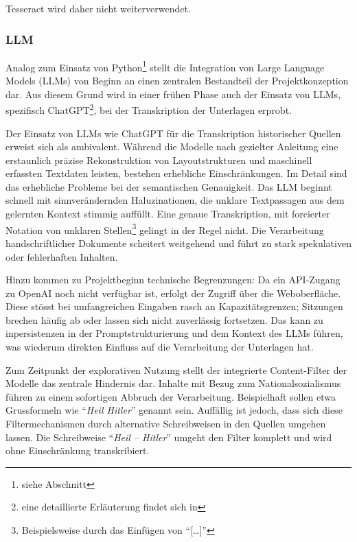 \documentclass[12pt, a4paper, ngerman, bidi=default]{article}
\begin{document}
Tesseract wird daher nicht weiterverwendet.

\subsubsection{LLM}\label{subsubsec:LLM_transcript}
Analog zum Einsatz von Python\footnote{siehe Abschnitt } stellt die Integration von Large Language Models (LLMs) von Beginn an einen zentralen Bestandteil der Projektkonzeption dar.
Aus diesem Grund wird in einer frühen Phase auch der Einsatz von LLMs, spezifisch ChatGPT\footnote{eine detaillierte Erläuterung findet sich in }, bei der Transkription der Unterlagen erprobt.

Der Einsatz von LLMs wie ChatGPT für die Transkription historischer Quellen erweist sich als ambivalent. Während die Modelle nach gezielter 
Anleitung eine erstaunlich präzise Rekonstruktion von Layoutstrukturen und maschinell erfassten Textdaten leisten, bestehen erhebliche Einschränkungen. Im Detail sind das
erhebliche Probleme bei der semantischen Genauigkeit. Das LLM beginnt schnell mit sinnverändernden Haluzinationen, die unklare Textpassagen aus dem gelernten Kontext stimmig auffüllt.
Eine genaue Transkription, mit forcierter Notation von unklaren Stellen\footnote{Beispielsweise durch das Einfügen von \enquote{[\dots]}} gelingt in der Regel nicht. 
Die Verarbeitung handschriftlicher Dokumente scheitert weitgehend und führt zu stark spekulativen oder fehlerhaften Inhalten.

Hinzu kommen zu Projektbeginn technische Begrenzungen: Da ein API-Zugang zu OpenAI noch nicht verfügbar ist, erfolgt der Zugriff 
über die Weboberfläche. Diese stösst bei umfangreichen Eingaben rasch an Kapazitätsgrenzen; 
Sitzungen brechen häufig ab oder lassen sich nicht zuverlässig fortsetzen. Das kann zu inpersistenzen in der Promptstrukturierung und
dem Kontext des LLMs führen, was wiederum direkten Einfluss auf die Verarbeitung der Unterlagen hat.

Zum Zeitpunkt der explorativen Nutzung stellt der integrierte Content-Filter der Modelle das zentrale Hindernis dar. Inhalte mit Bezug zum Nationalsozialismus
führen zu einem sofortigen Abbruch der Verarbeitung. Beispielhaft sollen etwa Grussformeln wie \enquote{\textit{Heil Hitler}} genannt sein. Auffällig ist jedoch, dass
sich diese Filtermechanismen durch alternative Schreibweisen in den Quellen umgehen lassen. Die Schreibweise \enquote{\textit{Heil -- Hitler}} umgeht den Filter komplett 
und wird ohne Einschränkung transkribiert.
\end{document}
